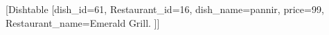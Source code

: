 [Dishtable [dish_id=61, Restaurant_id=16, dish_name=pannir, price=99, Restaurant_name=Emerald Grill.  ]]